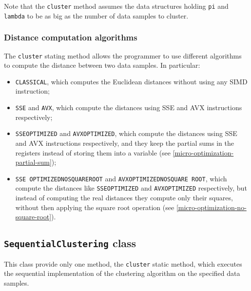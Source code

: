 \documentclass{article}
\begin{document}
Note that the \texttt{cluster} method assumes the data structures holding \texttt{pi} and
\texttt{lambda} to be as big as the number of data samples to cluster.

\hypertarget{distance-computation-algorithms}{
    \subsubsection{Distance computation algorithms}
    \label{distance-computation-algorithms}}

The \texttt{cluster} stating method allows the programmer to use different algorithms to compute
the distance between two data samples. In particular:
\begin{itemize}
    \item \texttt{CLASSICAL}, which computes the Euclidean distances without using any SIMD
    instruction;
    \item \texttt{SSE} and \texttt{AVX}, which compute the distances using SSE and AVX
    instructions respectively;
    \item \texttt{SSE\textunderscore OPTIMIZED} and \texttt{AVX\textunderscore OPTIMIZED}, which
    compute the distances using
    SSE and AVX instructions respectively, and they keep the partial sums in the registers
    instead of storing them into a variable (see
    \ref{micro-optimization-partial-sum});
    \item \texttt{SSE\textunderscore
    OPTIMIZED\textunderscore NO\textunderscore SQUARE\textunderscore ROOT} and
    \texttt{AVX\textunderscore OPTIMIZED\textunderscore NO\textunderscore SQUARE\textunderscore
    ROOT}, which compute the distances like \texttt{SSE\textunderscore OPTIMIZED} and
    \texttt{AVX\textunderscore OPTIMIZED}
    respectively, but instead of computing the real distances they compute only their squares,
    without then applying the square root operation (see \ref{micro-optimization-no-square-root}).
\end{itemize}

\hypertarget{sequential-clustering}{
    \subsection{\texttt{SequentialClustering} class}
    \label{sequential-clustering}}

This class provide only one method, the \texttt{cluster} static method, which executes the
sequential implementation of the clustering algorithm on the specified data samples.
\end{document}
